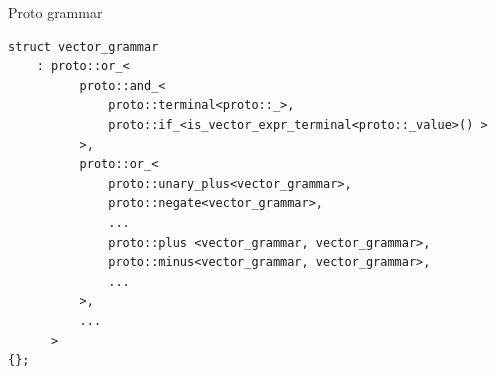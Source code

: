 \documentclass[@BEAMER_OPTIONS@]{beamer}
\begin{document}
\begin{frame}[fragile]{Proto grammar}
    \begin{exampleblock}{}
        \begin{lstlisting}
struct vector_grammar
    : proto::or_<
          proto::and_<
              proto::terminal<proto::_>,
              proto::if_<is_vector_expr_terminal<proto::_value>() >
          >,
          proto::or_<
              proto::unary_plus<vector_grammar>,
              proto::negate<vector_grammar>,
              ...
              proto::plus <vector_grammar, vector_grammar>,
              proto::minus<vector_grammar, vector_grammar>,
              ...
          >,
          ...
      >
{};
        \end{lstlisting}
    \end{exampleblock}
\end{frame}
\end{document}
